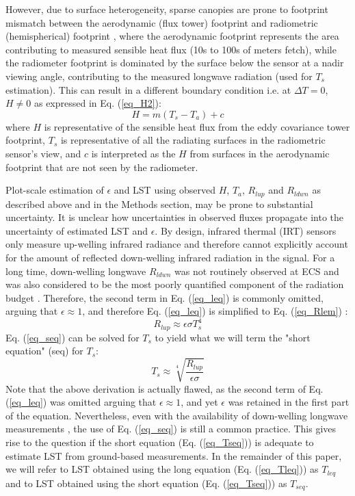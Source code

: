 \documentclass[fleqn,10pt]{wlscirep}
\begin{document}
However, due to surface heterogeneity, sparse canopies are prone to footprint mismatch between the aerodynamic (flux tower) footprint and radiometric (hemispherical) footprint \cite{chu2021representativeness,marcolla2018geometry,morillas2013using}, where the aerodynamic footprint represents the area contributing to measured sensible heat flux (10s to 100s of meters fetch), while the radiometer footprint is dominated by the surface below the sensor at a nadir viewing angle, contributing to the measured longwave radiation (used for $T_{s}$ estimation). This can result in a different boundary condition i.e. at $\Delta T =0$, $H \not= 0$ as expressed in Eq. (\ref{eq_H2}): 
\begin{equation}\label{eq_H2}
H= m(T_{s} - T_{a}) +  c    
\end{equation}
where $H$ is representative of the sensible heat flux from the eddy covariance tower footprint, $T_{s}$ is representative of all the radiating surfaces in the radiometric sensor’s view, and $c$ is interpreted as the $H$ from surfaces in the aerodynamic footprint that are not seen by the radiometer. 

Plot-scale estimation of $\epsilon$ and LST using observed $H$, $T_{a}$, $R_{lup}$ and $R_{ldwn}$ as described above and in the Methods section, may be prone to substantial uncertainty. It is unclear how uncertainties in observed fluxes propagate into the uncertainty of estimated LST and $\epsilon$. By design, infrared thermal (IRT) sensors only measure up-welling infrared radiance and therefore cannot explicitly account for the amount of reflected down-welling infrared radiation in the signal. For a long time, down-welling longwave $R_{ldwn}$ was not routinely observed at ECS \cite{wang2009evaluation} and was also considered to be the most poorly quantified component of the radiation budget \cite{trenberth2012tracking}. Therefore, the second term in Eq. (\ref{eq_leq}) is commonly omitted, arguing that $\epsilon\approx 1$, and therefore Eq. (\ref{eq_leq}) is simplified to Eq. (\ref{eq_Rlem}) \cite{crago2014use}:
\begin{equation}\label{eq_seq}
R_{lup} \approx  \epsilon \sigma T_{s}^{4}                
\end{equation} 
Eq. (\ref{eq_seq}) can be solved for $T_s$ to yield what we will term the "short equation" (seq) for $T_s$:
\begin{equation}\label{eq_Tseq}
T_{s} \approx \sqrt[4]{\frac{R_{lup}}{\epsilon \sigma}}
\end{equation} 
Note that the above derivation is actually flawed, as the second term of Eq. (\ref{eq_leq}) was omitted arguing that $\epsilon\approx 1$, and yet $\epsilon$ was retained in the first part of the equation. Nevertheless, even with the availability of down-welling longwave measurements \cite{stephens1995review}, the use of Eq. (\ref{eq_seq}) is still a common practice\cite{crago2014use,mallick2018bridging}. This gives rise to the question if the short equation (Eq. (\ref{eq_Tseq})) is adequate to estimate LST from ground-based measurements. In the remainder of this paper, we will refer to LST obtained using the long equation (Eq. (\ref{eq_Tleq})) as $T_{leq}$ and to LST obtained using the short equation (Eq. (\ref{eq_Tseq})) as $T_{seq}$.
\end{document}
